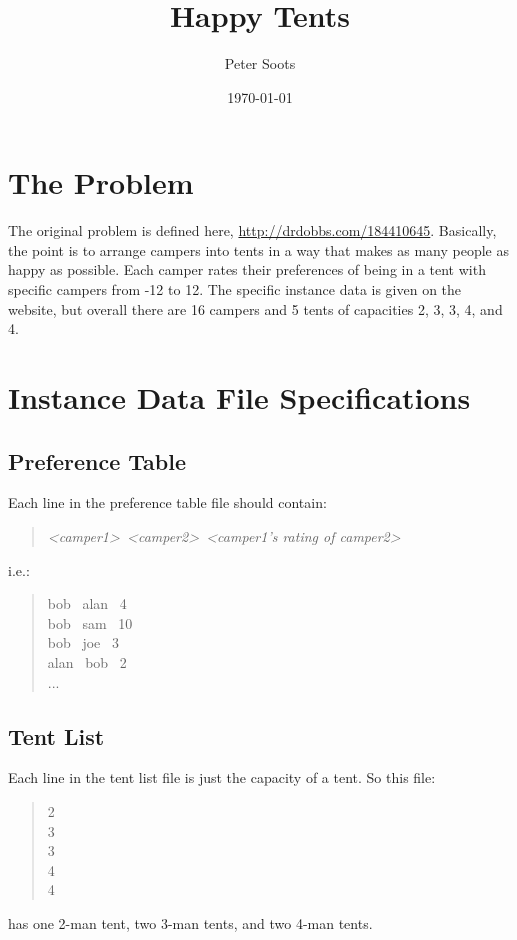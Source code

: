 \documentclass{article}
\begin{document}
\title{Happy Tents} 
\author{Peter Soots}
\date{\today}
\maketitle

\section{The Problem}
The original problem is defined here, \url{http://drdobbs.com/184410645}. Basically, the point is to arrange campers into tents in a way that makes as many people as happy as possible. Each camper rates their preferences of being in a tent with specific campers from -12 to 12. The specific instance data is given on the website, but overall there are 16 campers and 5 tents of capacities 2, 3, 3, 4, and 4.

\section{Instance Data File Specifications}
\subsection{Preference Table}
Each line in the preference table file should contain:
\begin{quote}
	\textit{\textless camper1\textgreater \ \textless camper2\textgreater \  \textless camper1's rating of camper2\textgreater}
\end{quote}
i.e.:
\begin{quote}
	bob \ alan \ 4 \\
	bob \ sam \ 10 \\
	bob \ joe \ 3 \\
	alan \ bob \ 2 \\ 
	...
\end{quote}

\subsection{Tent List}
Each line in the tent list file is just the capacity of a tent. So this file:
\begin{quote}
	2 \\
	3 \\
	3 \\
	4 \\
	4 
\end{quote}
has one 2-man tent, two 3-man tents, and two 4-man tents.
\end{document}
